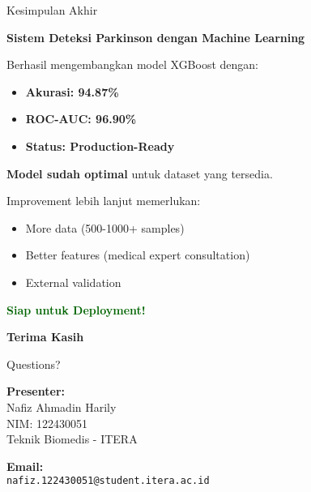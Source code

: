 \documentclass[aspectratio=169]{beamer}
\begin{document}
\begin{frame}{Kesimpulan Akhir}
\begin{center}
\Large
\textbf{Sistem Deteksi Parkinson dengan Machine Learning}

\vspace{0.5cm}
\normalsize
Berhasil mengembangkan model XGBoost dengan:

\vspace{0.3cm}
\begin{itemize}
    \item \textbf{Akurasi: 94.87\%}
    \item \textbf{ROC-AUC: 96.90\%}
    \item \textbf{Status: Production-Ready}
\end{itemize}

\vspace{0.5cm}
\textbf{Model sudah optimal} untuk dataset yang tersedia.

\vspace{0.3cm}
Improvement lebih lanjut memerlukan:
\begin{itemize}
    \item More data (500-1000+ samples)
    \item Better features (medical expert consultation)
    \item External validation
\end{itemize}

\vspace{0.5cm}
\Large
\textcolor{darkgreen}{\textbf{Siap untuk Deployment!}}
\end{center}
\end{frame}

\begin{frame}[standout]
\Huge
\textbf{Terima Kasih}

\vspace{1cm}
\Large
Questions?

\vspace{1cm}
\normalsize
\textbf{Presenter:}\\
Nafiz Ahmadin Harily\\
NIM: 122430051\\
Teknik Biomedis - ITERA

\vspace{0.5cm}
\textbf{Email:}\\
\texttt{nafiz.122430051@student.itera.ac.id}
\end{frame}
\end{document}

